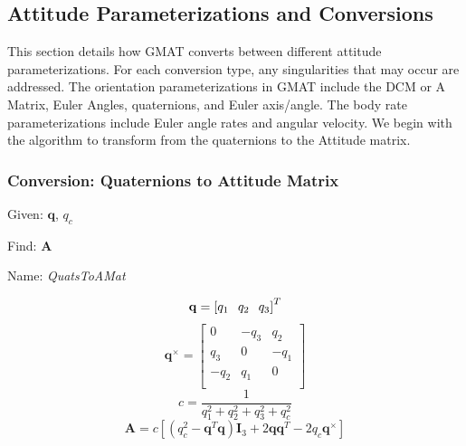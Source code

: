 \subsection{Attitude Parameterizations and Conversions}
\label{Sec:AttitudeParameterizations}
This section details how GMAT converts between different attitude
parameterizations.  For each conversion type, any singularities that may occur
are addressed.  The orientation parameterizations in GMAT include the DCM or A
Matrix, Euler Angles, quaternions, and Euler axis/angle.  The body rate
parameterizations include Euler angle rates and angular velocity.  We begin with
the algorithm to transform from the quaternions to the Attitude matrix.

\subsubsection{Conversion:  Quaternions to Attitude Matrix}\label{sec:QuatToAMat}

Given:  $\mathbf{q}$, $q_c$

\noindent Find:  $\mathbf{A}$

\noindent Name:  \emph{QuatsToAMat}

\begin{equation}
    \mathbf{q} = \left[ q_1 \hspace{.1 in} q_2 \hspace{.1 in} q_3 \right]^T
\end{equation}
\medskip
%
\begin{equation}
     \mathbf{q}^{\times} = \begin{bmatrix}
       0  & -q_3 &  q_2 \\
      q_3 &   0  & -q_1 \\
     -q_2 &  q_1 &   0  \\
     \end{bmatrix}
\end{equation}
\medskip
%
\begin{equation}
    c = \frac{1}{q_1^2 + q_2^2 + q_3^2 + q_c^2}
\end{equation}
\medskip
%
\begin{equation}
     \mathbf{A} = c\left[ (q_c^2 - \mathbf{q}^T\mathbf{q})\mathbf{I}_3 +
      2\mathbf{q}\mathbf{q}^T -2q_c\mathbf{q}^{\times}\right]
      \label{Eq:QuatsToAMat}
\end{equation}

